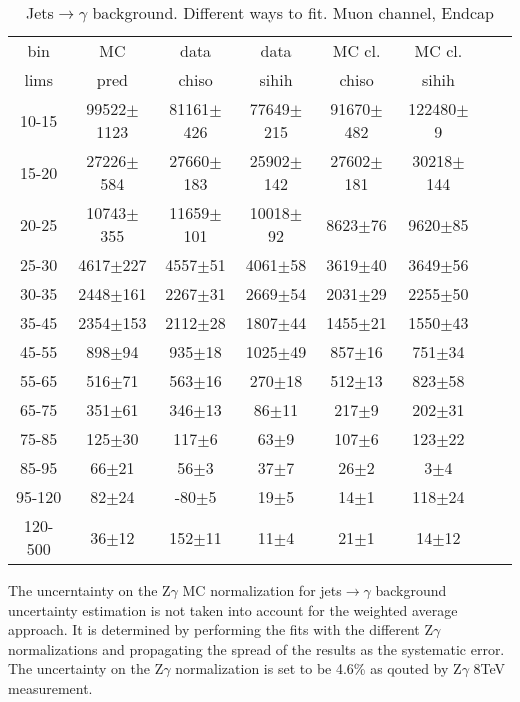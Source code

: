 \begin{table}[h]
  \scriptsize
  \begin{center}
  \caption{Jets$\rightarrow\gamma$ background. Different ways to fit. Muon channel, Endcap}
  \begin{tabular}{|c|c|c|c|c|c|c|c|}
    bin &  MC   & data  & data  & MC cl. & MC cl.\\ 
    lims & pred & chiso & sihih & chiso  & sihih \\ \hline
10-15 & 99522$\pm$1123 & 81161$\pm$426 & 77649$\pm$215 & 91670$\pm$482 & 122480$\pm$9   \\ \hline
15-20 & 27226$\pm$584 & 27660$\pm$183 & 25902$\pm$142 & 27602$\pm$181 & 30218$\pm$144   \\ \hline
20-25 & 10743$\pm$355 & 11659$\pm$101 & 10018$\pm$92 & 8623$\pm$76 & 9620$\pm$85   \\ \hline
25-30 & 4617$\pm$227 & 4557$\pm$51 & 4061$\pm$58 & 3619$\pm$40 & 3649$\pm$56   \\ \hline
30-35 & 2448$\pm$161 & 2267$\pm$31 & 2669$\pm$54 & 2031$\pm$29 & 2255$\pm$50   \\ \hline
35-45 & 2354$\pm$153 & 2112$\pm$28 & 1807$\pm$44 & 1455$\pm$21 & 1550$\pm$43   \\ \hline
45-55 & 898$\pm$94 & 935$\pm$18 & 1025$\pm$49 & 857$\pm$16 & 751$\pm$34   \\ \hline
55-65 & 516$\pm$71 & 563$\pm$16 & 270$\pm$18 & 512$\pm$13 & 823$\pm$58   \\ \hline
65-75 & 351$\pm$61 & 346$\pm$13 & 86$\pm$11 & 217$\pm$9 & 202$\pm$31   \\ \hline
75-85 & 125$\pm$30 & 117$\pm$6 & 63$\pm$9 & 107$\pm$6 & 123$\pm$22   \\ \hline
85-95 & 66$\pm$21 & 56$\pm$3 & 37$\pm$7 & 26$\pm$2 & 3$\pm$4   \\ \hline
95-120 & 82$\pm$24 & -80$\pm$5 & 19$\pm$5 & 14$\pm$1 & 118$\pm$24   \\ \hline
120-500 & 36$\pm$12 & 152$\pm$11 & 11$\pm$4 & 21$\pm$1 & 14$\pm$12   \\ \hline

  \end{tabular}
  \label{tab:Jets_to_gamma_diff_ways_to_fit_1}
  \end{center}
\end{table}


The uncerntainty on the Z$\gamma$ MC normalization for jets$\rightarrow\gamma$ background uncertainty estimation is not taken into account for the weighted average approach. It is determined by performing the fits with the different Z$\gamma$ normalizations and propagating the spread of the results as the systematic error. The uncertainty on the Z$\gamma$ normalization is set to be 4.6\% as qouted by Z$\gamma$ 8TeV measurement.\\


